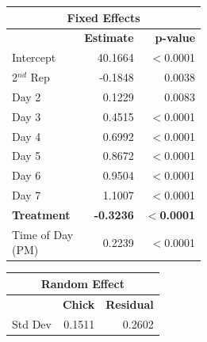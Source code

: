 \documentclass[a4paper, 10pt, titlepage]{article}
\newcommand\Tstrut{\rule{0pt}{2.9ex}}         %
\newcommand\Bstrut{\rule[-1.2ex]{0pt}{0pt}}   %
\begin{document}
\begin{table}[ht]
\centering
{} 
\begin{tabular}[t]{lrr}
 \hline
 \multicolumn{3}{c}{\textbf{Fixed Effects}}\\
 \hline
 & \textbf{Estimate} & \textbf{p-value}\Tstrut\\ 
 Intercept & 40.1664 & $<$0.0001\\
 2$^{nd}$ Rep & -0.1848 & 0.0038\\
 Day 2 & 0.1229 & 0.0083\\
 Day 3 & 0.4515 & $<$0.0001\\
 Day 4 & 0.6992 & $<$0.0001\\
 Day 5 & 0.8672 & $<$0.0001\\
 Day 6 & 0.9504 & $<$0.0001\\
 Day 7 & 1.1007 & $<$0.0001\\
 \textbf{Treatment} & \textbf{-0.3236} & \textbf{$<$0.0001}\\
 \makecell[l]{Time of Day \\ (PM)\Bstrut} & 0.2239 & $<$0.0001\\
 \hline
\end{tabular}
\quad
\begin{tabular}[t]{lrr}
 \hline
\multicolumn{3}{c}{\textbf{Random Effect}}\\
 \hline
 & \textbf{Chick} & \textbf{Residual}\Tstrut \\ 
 Std Dev & 0.1511 & 0.2602\Bstrut\\
 \hline
\end{tabular}
\label{table:Est 90 R}
\end{table}
\end{document}
